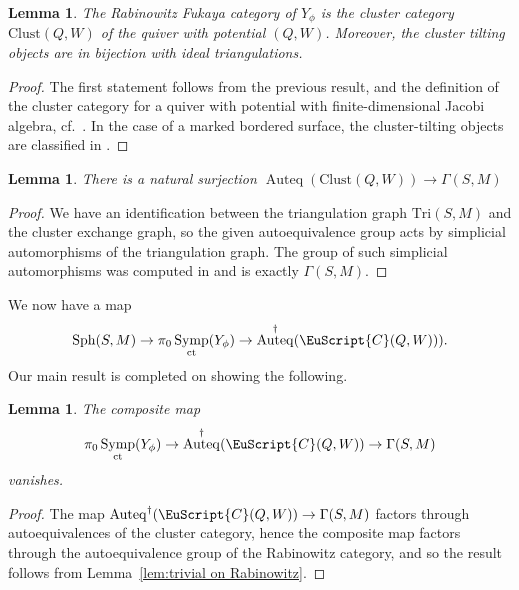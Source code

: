 \documentclass[10pt,a4paper]{amsart}
\DeclareMathOperator{\Auteq}{Auteq}
\newcommand{\scrC}{\EuScript{C}}
\DeclareMathOperator{\Symp}{Symp}
\newtheorem{lem}[thm]{Lemma}
\theoremstyle{definition}
\numberwithin{equation}{section}
\begin{document}
\begin{lem}
The Rabinowitz Fukaya category of $Y_{\phi}$ is the cluster category $\mathrm{Clust}(Q,W)$ of the quiver with potential $(Q,W)$. Moreover, the cluster tilting objects are in bijection with ideal triangulations.
\end{lem}

\begin{proof}
The first statement follows from the previous result, and the definition of the cluster category for a quiver with potential with finite-dimensional Jacobi algebra, cf.~\cite{Amiot}. In the case of a marked bordered surface, the cluster-tilting objects are classified in \cite{Brustle-Zhang}.
\end{proof}

\begin{lem}
There is a natural surjection $\Auteq(\mathrm{Clust}(Q,W)) \longrightarrow \Gamma(S,M)$
\end{lem}

\begin{proof}
We have an identification between the triangulation graph $\mathrm{Tri}(S,M)$ and the cluster exchange graph, so the given autoequivalence group acts by simplicial automorphisms of the triangulation graph. The group of such simplicial automorphisms was computed in \cite{Disarlo} and is exactly $\Gamma(S,M)$.
\end{proof}

We now have a map
\[
\mathrm{Sph}(S,M) \to \pi_0\Symp_{\rm ct}(Y_{\phi}) \to \Auteq^{\dagger}(\scrC(Q,W))).
\]
Our main result is completed on showing the following.

\begin{lem}
The composite map
\[
\pi_0\Symp_{\rm ct}(Y_{\phi}) \to \Auteq^{\dagger}(\scrC(Q,W)) \to \Gamma(S,M)
\]
vanishes.
\end{lem}

\begin{proof}
The map $\Auteq^{\dagger}(\scrC(Q,W)) \to \Gamma(S,M)$ factors through autoequivalences of the cluster category, hence the composite map factors through the autoequivalence group of the Rabinowitz category, and so the result follows from Lemma~\ref{lem:trivial on Rabinowitz}.
\end{proof}
\end{document}
